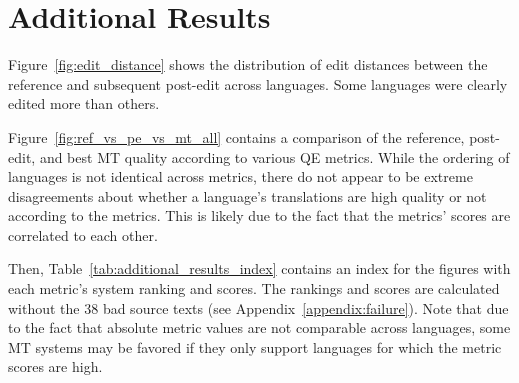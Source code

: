 \section{Additional Results}
\label{appendix:additional_results}

Figure~\ref{fig:edit_distance} shows the distribution of edit distances between the reference and subsequent post-edit across languages.
Some languages were clearly edited more than others.



Figure~\ref{fig:ref_vs_pe_vs_mt_all} contains a comparison of the reference, post-edit, and best MT quality according to various QE metrics.
While the ordering of languages is not identical across metrics, there do not appear to be extreme disagreements about whether a language's translations are high quality or not according to the metrics.
This is likely due to the fact that the metrics' scores are correlated to each other.



Then, Table~\ref{tab:additional_results_index} contains an index for the figures with each metric's system ranking and scores.
The rankings and scores are calculated without the 38 bad source texts (see Appendix~\ref{appendix:failure}).
Note that due to the fact that absolute metric values are not comparable across languages, some MT systems may be favored if they only support languages for which the metric scores are high.



